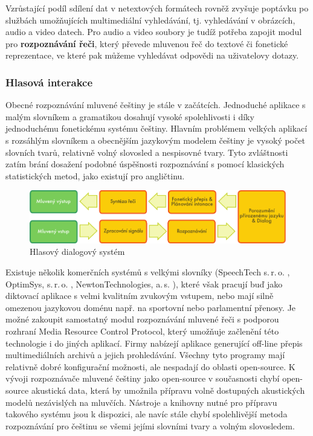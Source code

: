 \begin{multicols}{2}
Vzrůstající podíl sdílení dat v netextových formátech rovněž zvyšuje poptávku po službách umožňujících multimediální vyhledávání, tj. vyhledávání v obrázcích, audio a video datech. Pro audio a video soubory je tudíž potřeba zapojit modul pro \textbf{rozpoznávání řeči}, který převede mluvenou řeč do textové či fonetické reprezentace, ve které pak můžeme vyhledávat odpovědi na uživatelovy dotazy.

\subsubsection{Hlasová interakce}

Obecné rozpoznávání mluvené češtiny je stále v začátcích. Jednoduché aplikace s malým slovníkem a gramatikou dosahují vysoké spolehlivosti i díky jednoduchému fonetickému systému češtiny. Hlavním problémem velkých aplikací s rozsáhlým slovníkem a obecnějším jazykovým modelem češtiny je vysoký počet slovních tvarů, relativně volný slovosled a nespisovné tvary. Tyto zvláštnosti zatím brání dosažení podobné úspěšnosti rozpoznávání s pomocí klasických statistických metod, jako existují pro angličtinu.
\begin{figure}[htb]
  \center
  \includegraphics[width=\textwidth]{../_media/czech/simple_speech-based_dialogue_architecture}
  \caption{Hlasový dialogový systém}
  \label{fig:dialoguearch_cz}
\end{figure}
Existuje několik komerčních systémů s velkými slovníky (SpeechTech s.\,r.\,o. \cite{Note11}, OptimSys, s.\,r.\,o. \cite{Note12}, NewtonTechnologies, a.\,s. \cite{Note13}), které však pracují buď jako diktovací aplikace s velmi kvalitním zvukovým vstupem, nebo mají silně omezenou jazykovou doménu např. na sportovní nebo parlamentní přenosy. Je možné zakoupit samostatný modul rozpoznávání mluvené řeči s podporou rozhraní Media Resource Control Protocol, který umožňuje začlenění této technologie i do jiných aplikací. Firmy nabízejí aplikace generující off-line přepis multimediálních archivů a jejich prohledávání. Všechny tyto programy mají relativně dobré konfigurační možnosti, ale nespadají do oblasti open-source. K vývoji rozpoznávače mluvené češtiny jako open-source v současnosti chybí open-source akustická data, která by umožnila přípravu volně dostupných akustických modelů nezávislých na mluvčích. Nástroje a knihovny nutné pro přípravu takového systému jsou k dispozici, ale navíc stále chybí spolehlivější metoda rozpoznávání pro češtinu se všemi jejími slovními tvary a volným slovosledem.\\

\end{multicols}
